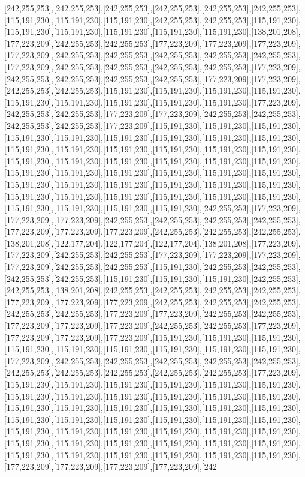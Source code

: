 [242,255,253],[242,255,253],[242,255,253],[242,255,253],[242,255,253],[242,255,253],[115,191,230],[115,191,230],[115,191,230],[242,255,253],[242,255,253],[115,191,230],[115,191,230],[115,191,230],[115,191,230],[115,191,230],[115,191,230],[138,201,208],[177,223,209],[242,255,253],[242,255,253],[177,223,209],[177,223,209],[177,223,209],[177,223,209],[242,255,253],[242,255,253],[242,255,253],[242,255,253],[242,255,253],[177,223,209],[242,255,253],[242,255,253],[242,255,253],[242,255,253],[177,223,209],[242,255,253],[242,255,253],[242,255,253],[242,255,253],[177,223,209],[177,223,209],[242,255,253],[242,255,253],[115,191,230],[115,191,230],[115,191,230],[115,191,230],[115,191,230],[115,191,230],[115,191,230],[115,191,230],[115,191,230],[177,223,209],[242,255,253],[242,255,253],[177,223,209],[177,223,209],[242,255,253],[242,255,253],[242,255,253],[242,255,253],[177,223,209],[115,191,230],[115,191,230],[115,191,230],[115,191,230],[115,191,230],[115,191,230],[115,191,230],[115,191,230],[115,191,230],[115,191,230],[115,191,230],[115,191,230],[115,191,230],[115,191,230],[115,191,230],[115,191,230],[115,191,230],[115,191,230],[115,191,230],[115,191,230],[115,191,230],[115,191,230],[115,191,230],[115,191,230],[115,191,230],[115,191,230],[115,191,230],[115,191,230],[115,191,230],[115,191,230],[115,191,230],[115,191,230],[115,191,230],[115,191,230],[115,191,230],[115,191,230],[115,191,230],[115,191,230],[115,191,230],[115,191,230],[115,191,230],[115,191,230],[115,191,230],[242,255,253],[177,223,209],[177,223,209],[177,223,209],[242,255,253],[242,255,253],[242,255,253],[242,255,253],[177,223,209],[177,223,209],[177,223,209],[242,255,253],[242,255,253],[242,255,253],[138,201,208],[122,177,204],[122,177,204],[122,177,204],[138,201,208],[177,223,209],[177,223,209],[242,255,253],[242,255,253],[177,223,209],[177,223,209],[177,223,209],[177,223,209],[242,255,253],[242,255,253],[115,191,230],[242,255,253],[242,255,253],[242,255,253],[242,255,253],[115,191,230],[115,191,230],[115,191,230],[242,255,253],[242,255,253],[138,201,208],[242,255,253],[242,255,253],[242,255,253],[242,255,253],[177,223,209],[177,223,209],[177,223,209],[242,255,253],[242,255,253],[242,255,253],[242,255,253],[242,255,253],[177,223,209],[177,223,209],[242,255,253],[242,255,253],[177,223,209],[177,223,209],[177,223,209],[242,255,253],[242,255,253],[177,223,209],[177,223,209],[177,223,209],[177,223,209],[115,191,230],[115,191,230],[115,191,230],[115,191,230],[115,191,230],[115,191,230],[115,191,230],[115,191,230],[115,191,230],[177,223,209],[242,255,253],[242,255,253],[242,255,253],[242,255,253],[242,255,253],[242,255,253],[242,255,253],[242,255,253],[242,255,253],[242,255,253],[177,223,209],[115,191,230],[115,191,230],[115,191,230],[115,191,230],[115,191,230],[115,191,230],[115,191,230],[115,191,230],[115,191,230],[115,191,230],[115,191,230],[115,191,230],[115,191,230],[115,191,230],[115,191,230],[115,191,230],[115,191,230],[115,191,230],[115,191,230],[115,191,230],[115,191,230],[115,191,230],[115,191,230],[115,191,230],[115,191,230],[115,191,230],[115,191,230],[115,191,230],[115,191,230],[115,191,230],[115,191,230],[115,191,230],[115,191,230],[115,191,230],[115,191,230],[115,191,230],[115,191,230],[115,191,230],[115,191,230],[115,191,230],[115,191,230],[115,191,230],[177,223,209],[177,223,209],[177,223,209],[177,223,209],[242